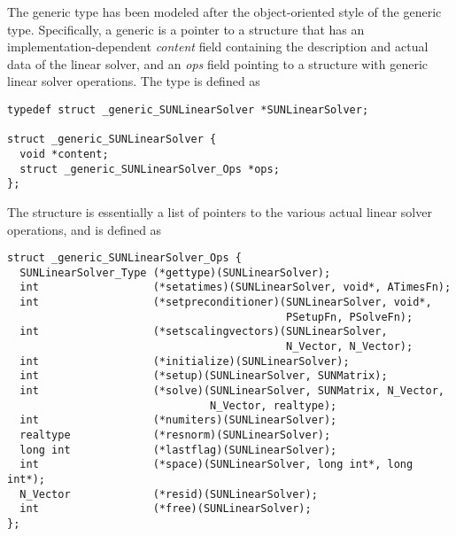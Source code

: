 The generic  type has been modeled after the
object-oriented style of the generic  type.
Specifically, a generic  is a pointer to a structure
that has an implementation-dependent {\em content} field containing
the description and actual data of the linear solver, and an {\em ops}
field pointing to a structure with generic linear solver operations.
The type  is defined as
\begin{verbatim}
typedef struct _generic_SUNLinearSolver *SUNLinearSolver;

struct _generic_SUNLinearSolver {
  void *content;
  struct _generic_SUNLinearSolver_Ops *ops;
};
\end{verbatim}
The  structure is essentially a
list of pointers to the various actual linear solver operations, and
is defined as 
\begin{verbatim}
struct _generic_SUNLinearSolver_Ops {
  SUNLinearSolver_Type (*gettype)(SUNLinearSolver);
  int                  (*setatimes)(SUNLinearSolver, void*, ATimesFn);
  int                  (*setpreconditioner)(SUNLinearSolver, void*, 
                                            PSetupFn, PSolveFn);
  int                  (*setscalingvectors)(SUNLinearSolver,
                                            N_Vector, N_Vector);
  int                  (*initialize)(SUNLinearSolver);
  int                  (*setup)(SUNLinearSolver, SUNMatrix);
  int                  (*solve)(SUNLinearSolver, SUNMatrix, N_Vector, 
                                N_Vector, realtype);
  int                  (*numiters)(SUNLinearSolver);
  realtype             (*resnorm)(SUNLinearSolver);
  long int             (*lastflag)(SUNLinearSolver);
  int                  (*space)(SUNLinearSolver, long int*, long int*);
  N_Vector             (*resid)(SUNLinearSolver);
  int                  (*free)(SUNLinearSolver);
};
\end{verbatim}

